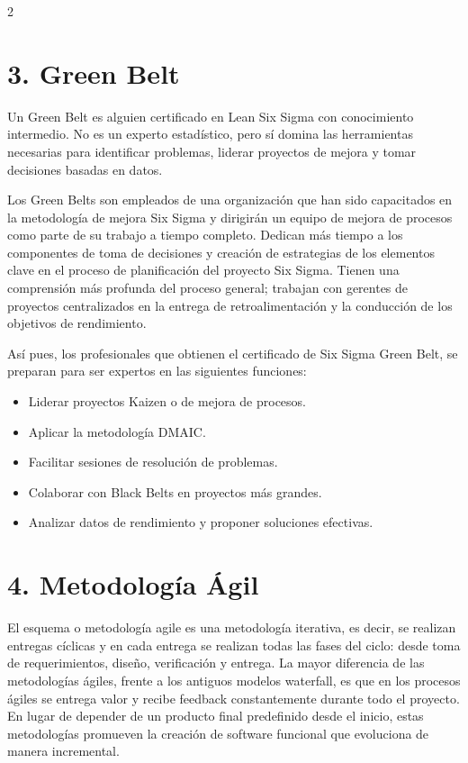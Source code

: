 \documentclass[10pt,a4paper]{article}
\begin{document}
\begin{multicols}{2}
\section*{3. Green Belt}
Un Green Belt es alguien certificado en Lean Six Sigma con conocimiento intermedio. No es un experto estadístico, pero sí domina las herramientas necesarias para identificar problemas, liderar proyectos de mejora y tomar decisiones basadas en datos.

Los Green Belts son empleados de una organización que han sido capacitados en la metodología de mejora Six Sigma y dirigirán un equipo de mejora de procesos como parte de su trabajo a tiempo completo. Dedican más tiempo a los componentes de toma de decisiones y creación de estrategias de los elementos clave en el proceso de planificación del proyecto Six Sigma. Tienen una comprensión más profunda del proceso general; trabajan con gerentes de proyectos centralizados en la entrega de retroalimentación y la conducción de los objetivos de rendimiento.

Así pues, los profesionales que obtienen el certificado de Six Sigma Green Belt, se preparan para ser expertos en las siguientes funciones:

\begin{itemize}[leftmargin=*, noitemsep, topsep=0pt]
    \item Liderar proyectos Kaizen o de mejora de procesos.
    \item Aplicar la metodología DMAIC.
    \item Facilitar sesiones de resolución de problemas.
    \item Colaborar con Black Belts en proyectos más grandes.
    \item Analizar datos de rendimiento y proponer soluciones efectivas.
\end{itemize}

\section*{4. Metodología Ágil}
El esquema o metodología agile es una metodología iterativa, es decir, se realizan entregas cíclicas y en cada entrega se realizan todas las fases del ciclo: desde toma de requerimientos, diseño, verificación y entrega. La mayor diferencia de las metodologías ágiles, frente a los antiguos modelos waterfall, es que en los procesos ágiles se entrega valor y recibe feedback constantemente durante todo el proyecto. En lugar de depender de un producto final predefinido desde el inicio, estas metodologías promueven la creación de software funcional que evoluciona de manera incremental.


\end{multicols}
\end{document}
